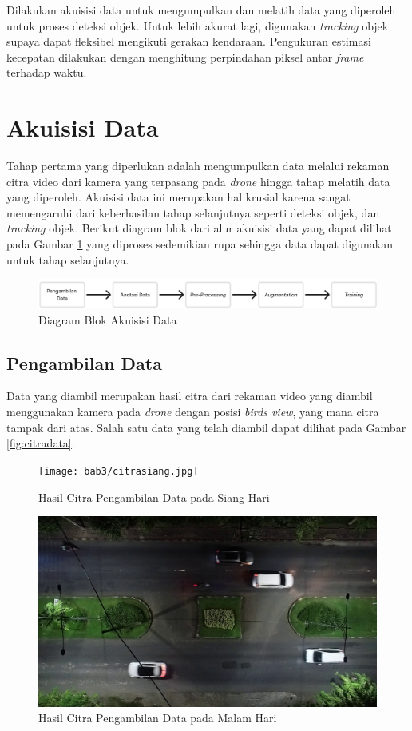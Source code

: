 Dilakukan akuisisi data untuk mengumpulkan dan melatih data yang diperoleh untuk proses deteksi objek. Untuk lebih akurat lagi, digunakan \emph{tracking} objek supaya dapat fleksibel mengikuti gerakan kendaraan. Pengukuran estimasi kecepatan dilakukan dengan menghitung perpindahan piksel antar \emph{frame} terhadap waktu.

\section{Akuisisi Data}
Tahap pertama yang diperlukan adalah mengumpulkan data melalui rekaman citra video dari kamera yang terpasang pada \emph{drone} hingga tahap melatih data yang diperoleh. Akuisisi data ini merupakan hal krusial karena sangat memengaruhi dari keberhasilan tahap selanjutnya seperti deteksi objek, dan \emph{tracking} objek. Berikut diagram blok dari alur akuisisi data yang dapat dilihat pada Gambar \ref{fig:akuisisidata} yang diproses sedemikian rupa sehingga data dapat digunakan untuk tahap selanjutnya.

\begin{figure} [H] \centering
  \includegraphics[scale=0.35]{bab3/akuisisidata.jpg}
  \caption{Diagram Blok Akuisisi Data}
  \label{fig:akuisisidata}
\end{figure}

\subsection{Pengambilan Data}
Data yang diambil merupakan hasil citra dari rekaman video yang diambil menggunakan kamera pada \emph{drone} dengan posisi \emph{birds view}, yang mana citra tampak dari atas. Salah satu data yang telah diambil dapat dilihat pada Gambar \ref{fig:citradata}.

\begin{figure} [H] \centering
  \texttt{[image: bab3/citrasiang.jpg]}
  \caption{Hasil Citra Pengambilan Data pada Siang Hari}
  \label{fig:datacitra_siang}
\end{figure}

\begin{figure} [H] \centering
  \includegraphics[scale=0.225]{bab3/citramalam.jpg}
  \caption{Hasil Citra Pengambilan Data pada Malam Hari}
  \label{fig:datacitra_malam}
\end{figure}

